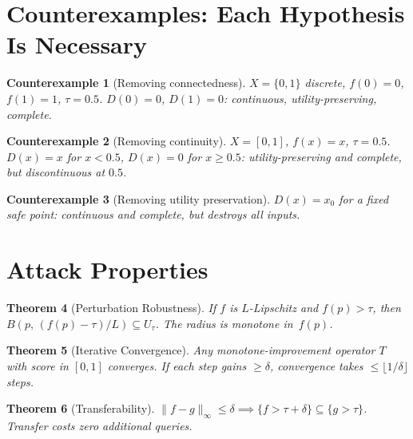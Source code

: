 \documentclass[11pt]{article}
\newtheorem{theorem}{Theorem}[section]
\newtheorem{counterexample}[theorem]{Counterexample}
\begin{document}
\section{Counterexamples: Each Hypothesis Is Necessary}
\label{app:counterexamples}

\begin{counterexample}[Removing connectedness]
$X = \{0,1\}$ discrete, $f(0)=0$, $f(1)=1$, $\tau=0.5$.
$D(0)=0$, $D(1)=0$: continuous, utility-preserving, complete.
\end{counterexample}

\begin{counterexample}[Removing continuity]
$X=[0,1]$, $f(x)=x$, $\tau=0.5$. $D(x)=x$ for $x<0.5$,
$D(x)=0$ for $x \geq 0.5$: utility-preserving and complete,
but discontinuous at $0.5$.
\end{counterexample}

\begin{counterexample}[Removing utility preservation]
$D(x) = x_0$ for a fixed safe point: continuous and complete,
but destroys all inputs.
\end{counterexample}

\begin{table}[h]
\centering
\small
\caption{Counterexample ablation. Each row drops one of the three
hypotheses and reports whether the defense becomes complete, together
with the price paid in the other two properties.}
\label{tab:counterexample-ablation}

\end{table}


\section{Attack Properties}
\label{app:attacks}

\begin{theorem}[Perturbation Robustness]
\label{thm:lipschitz}
If $f$ is $L$-Lipschitz and $f(p)>\tau$, then
$B(p,\, (f(p)-\tau)/L) \subseteq U_\tau$.
The radius is monotone in~$f(p)$.
\end{theorem}

\begin{theorem}[Iterative Convergence]
\label{thm:convergence}
Any monotone-improvement operator $T$ with score in $[0,1]$ converges.
If each step gains $\geq \delta$, convergence takes
$\leq \lfloor 1/\delta \rfloor$ steps.
\end{theorem}

\begin{theorem}[Transferability]
\label{thm:transfer}
$\|f-g\|_\infty \leq \delta \implies
\{f > \tau+\delta\} \subseteq \{g > \tau\}$.
Transfer costs zero additional queries.
\end{theorem}
\end{document}
